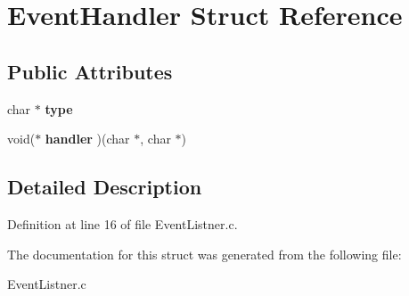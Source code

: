 \hypertarget{structEventHandler}{
\section{EventHandler Struct Reference}
\label{structEventHandler}
}
\subsection*{Public Attributes}
\begin{DoxyCompactItemize}
\item 
\hypertarget{structEventHandler_a6247baa79dd43146241fc659e28c4d7a}{
char $\ast$ {\bfseries type}}
\label{structEventHandler_a6247baa79dd43146241fc659e28c4d7a}

\item 
\hypertarget{structEventHandler_a45b763adf4738d94444b1d695b16a9bc}{
void($\ast$ {\bfseries handler} )(char $\ast$, char $\ast$)}
\label{structEventHandler_a45b763adf4738d94444b1d695b16a9bc}

\end{DoxyCompactItemize}


\subsection{Detailed Description}


Definition at line 16 of file EventListner.c.



The documentation for this struct was generated from the following file:\begin{DoxyCompactItemize}
\item 
EventListner.c\end{DoxyCompactItemize}
